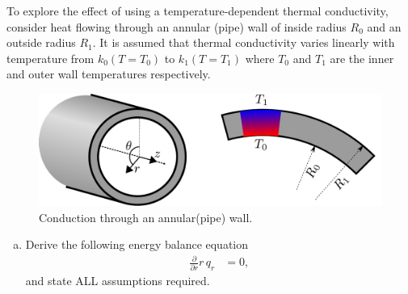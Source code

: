 \documentclass[calculator,datasheet,handbook,solutions]{exam}
\begin{document}
\begin{question}
  To explore the effect of using a temperature-dependent thermal
  conductivity, consider heat flowing through an annular (pipe) wall
  of inside radius $R_{0}$ and an outside radius $R_{1}$. It is
  assumed that thermal conductivity varies linearly with temperature
  from $k_{0}(T=T_{0})$ to $k_{1}(T=T_{1})$ where $T_{0}$ and $T_{1}$
  are the inner and outer wall temperatures respectively.
  \begin{figure}[ht]%
    \begin{center}%
      \includegraphics[width=0.8\linewidth,clip]{figures/cyl_cond}%
    \end{center}
    \caption{\label{fig:cylindrical_cond} Conduction through an annular(pipe) wall.}
  \end{figure}
  \begin{enumerate}[a)]
  \item Derive the following energy balance equation
    \begin{align*}
      \frac{\partial}{\partial r} r\, q_r &= 0,
    \end{align*}
    and state ALL assumptions required.
\end{enumerate}
\end{question}
\end{document}
